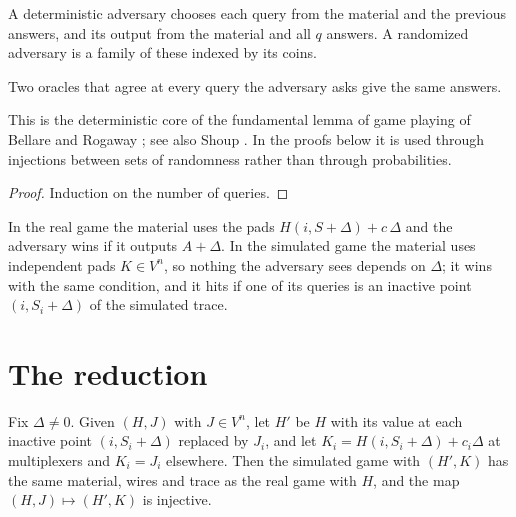 \begin{definition}[Adversary]
  \label{def:qadv}
  \leanok
  A deterministic adversary chooses each query from the material and the previous answers, and its
  output from the material and all $q$ answers. A randomized adversary is a family of these
  indexed by its coins.
\end{definition}

\begin{lemma}
  \label{lem:answers-congr}
  \leanok
  Two oracles that agree at every query the adversary asks give the same answers.
\end{lemma}

This is the deterministic core of the fundamental lemma of game playing of Bellare and Rogaway
\cite[Lemma~2]{BR06}; see also Shoup \cite{Sho04}. In the proofs below it is used through injections
between sets of randomness rather than through probabilities.

\begin{proof}
  \leanok
  Induction on the number of queries.
\end{proof}

\begin{definition}
  \label{def:games}
  \leanok
  In the real game the material uses the pads $H(i, S + \Delta) + c\,\Delta$ and the adversary
  wins if it outputs $A + \Delta$. In the simulated game the material uses independent pads
  $K \in V^n$, so nothing the adversary sees depends on $\Delta$; it wins with the same condition,
  and it hits if one of its queries is an inactive point $(i, S_i + \Delta)$ of the simulated
  trace.
\end{definition}

\section{The reduction}

\begin{lemma}
  \label{lem:to-sim}
  \leanok
  Fix $\Delta \neq 0$. Given $(H, J)$ with $J \in V^n$, let $H'$ be $H$ with its value at each
  inactive point $(i, S_i + \Delta)$ replaced by $J_i$, and let $K_i = H(i, S_i + \Delta) + c_i\Delta$
  at multiplexers and $K_i = J_i$ elsewhere. Then the simulated game with $(H', K)$ has the same
  material, wires and trace as the real game with $H$, and the map $(H, J) \mapsto (H', K)$ is
  injective.
\end{lemma}

